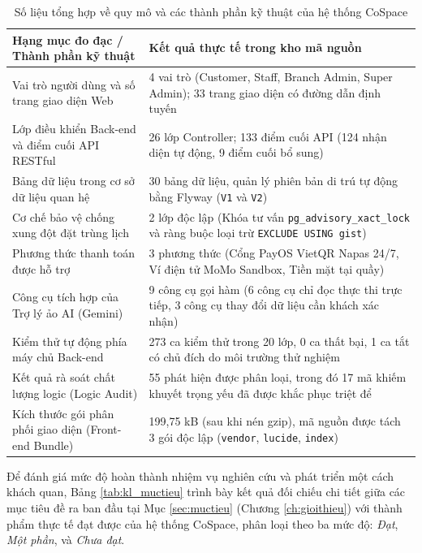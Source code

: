 \begin{table}[H]
\centering
\caption{Số liệu tổng hợp về quy mô và các thành phần kỹ thuật của hệ thống CoSpace}
\label{tab:kl_solieu}
\small
\renewcommand{\arraystretch}{1.25}
\begin{tabular}{|p{7.4cm}|p{6.2cm}|}
\hline
\textbf{Hạng mục đo đạc / Thành phần kỹ thuật} & \textbf{Kết quả thực tế trong kho mã nguồn} \\
\hline
Vai trò người dùng và số trang giao diện Web & 4 vai trò (Customer, Staff, Branch Admin, Super Admin); 33 trang giao diện có đường dẫn định tuyến \\
\hline
Lớp điều khiển Back-end và điểm cuối API RESTful & 26 lớp Controller; 133 điểm cuối API (124 nhận diện tự động, 9 điểm cuối bổ sung) \\
\hline
Bảng dữ liệu trong cơ sở dữ liệu quan hệ & 30 bảng dữ liệu, quản lý phiên bản di trú tự động bằng Flyway (\texttt{V1} và \texttt{V2}) \\
\hline
Cơ chế bảo vệ chống xung đột đặt trùng lịch & 2 lớp độc lập (Khóa tư vấn \texttt{pg\_advisory\_xact\_lock} và ràng buộc loại trừ \texttt{EXCLUDE USING gist}) \\
\hline
Phương thức thanh toán được hỗ trợ & 3 phương thức (Cổng PayOS VietQR Napas 24/7, Ví điện tử MoMo Sandbox, Tiền mặt tại quầy) \\
\hline
Công cụ tích hợp của Trợ lý ảo AI (Gemini) & 9 công cụ gọi hàm (6 công cụ chỉ đọc thực thi trực tiếp, 3 công cụ thay đổi dữ liệu cần khách xác nhận) \\
\hline
Kiểm thử tự động phía máy chủ Back-end & 273 ca kiểm thử trong 20 lớp, 0 ca thất bại, 1 ca tắt có chủ đích do môi trường thử nghiệm \\
\hline
Kết quả rà soát chất lượng logic (Logic Audit) & 55 phát hiện được phân loại, trong đó 17 mã khiếm khuyết trọng yếu đã được khắc phục triệt để \\
\hline
Kích thước gói phân phối giao diện (Front-end Bundle) & 199{,}75 kB (sau khi nén gzip), mã nguồn được tách 3 gói độc lập (\texttt{vendor}, \texttt{lucide}, \texttt{index}) \\
\hline
\end{tabular}
\end{table}

Để đánh giá mức độ hoàn thành nhiệm vụ nghiên cứu và phát triển một cách khách quan, Bảng \ref{tab:kl_muctieu} trình bày kết quả đối chiếu chi tiết giữa các mục tiêu đề ra ban đầu tại Mục \ref{sec:muctieu} (Chương \ref{ch:gioithieu}) với thành phẩm thực tế đạt được của hệ thống CoSpace, phân loại theo ba mức độ: \textit{Đạt}, \textit{Một phần}, và \textit{Chưa đạt}.

